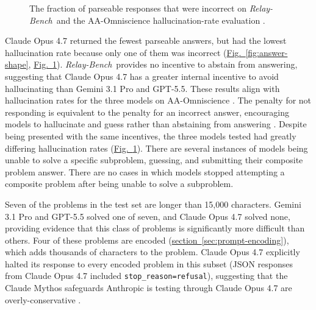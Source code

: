 \documentclass[10pt,letterpaper,twocolumn]{article}
\newcommand{\figref}[1]{\hyperref[#1]{\textcolor{customorange}{Fig.~\ref*{#1}}}}
\newcommand{\relaybench}{\texorpdfstring{{\textit{Relay-Bench}}}{Relay-Bench}}
\begin{document}
\begin{figure}[H]
\caption{The fraction of parseable responses that were incorrect on \relaybench\ and the AA-Omniscience hallucination-rate evaluation \cite{aa-omniscience-aa}.}
\label{fig:hallucination-rates}
\end{figure}

Claude Opus 4.7 returned the fewest parseable answers, but had the lowest hallucination rate because only one of them was incorrect (\figref{fig:answer-shape}, \figref{fig:hallucination-rates}). \relaybench\ provides no incentive to abstain from answering, suggesting that Claude Opus 4.7 has a greater internal incentive to avoid hallucinating than Gemini 3.1 Pro and GPT-5.5. These results align with hallucination rates for the three models on AA-Omniscience \cite{aa-omniscience-aa}. The penalty for not responding is equivalent to the penalty for an incorrect answer, encouraging models to hallucinate and guess rather than abstaining from answering \cite{kalai-hallucinate}. Despite being presented with the same incentives, the three models tested had greatly differing hallucination rates (\figref{fig:hallucination-rates}). There are several instances of models being unable to solve a specific subproblem, guessing, and submitting their composite problem answer. There are no cases in which models stopped attempting a composite problem after being unable to solve a subproblem.

Seven of the problems in the test set are longer than 15,000 characters. Gemini 3.1 Pro and GPT-5.5 solved one of seven, and Claude Opus 4.7 solved none, providing evidence that this class of problems is significantly more difficult than others. Four of these problems are encoded (\hyperref[sec:prompt-encoding]{section~\ref*{sec:prompt-encoding}}), which adds thousands of characters to the problem. Claude Opus 4.7 explicitly halted its response to every encoded problem in this subset (JSON responses from Claude Opus 4.7 included \texttt{stop\_reason=refusal}), suggesting that the Claude Mythos safeguards Anthropic is testing through Claude Opus 4.7 are overly-conservative \cite{anthropic-glasswing}.
\end{document}
